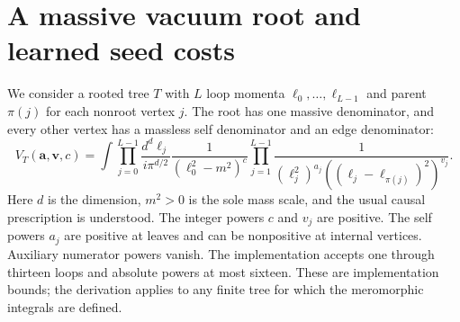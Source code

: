 \section{A massive vacuum root and learned seed costs}
\label{app:notes-vac-ml}
We consider a rooted tree $T$ with $L$ loop momenta $\ell_0,\ldots,\ell_{L-1}$ and parent $\pi(j)$ for each nonroot vertex $j$. The root has one massive denominator, and every other vertex has a massless self denominator and an edge denominator:
\begin{equation}
 V_T(\mathbf a,\mathbf v,c)=
 \int\prod_{j=0}^{L-1}\frac{d^d\ell_j}{i\pi^{d/2}}
 \frac{1}{(\ell_0^2-m^2)^c}
 \prod_{j=1}^{L-1}\frac{1}{(\ell_j^2)^{a_j}
 ((\ell_j-\ell_{\pi(j)})^2)^{v_j}} .
 \label{eq:notes-vac-ml-family}
\end{equation}
Here $d$ is the dimension, $m^2>0$ is the sole mass scale, and the usual causal prescription is understood. The integer powers $c$ and $v_j$ are positive. The self powers $a_j$ are positive at leaves and can be nonpositive at internal vertices. Auxiliary numerator powers vanish. The implementation accepts one through thirteen loops and absolute powers at most sixteen. These are implementation bounds; the derivation applies to any finite tree for which the meromorphic integrals are defined.


